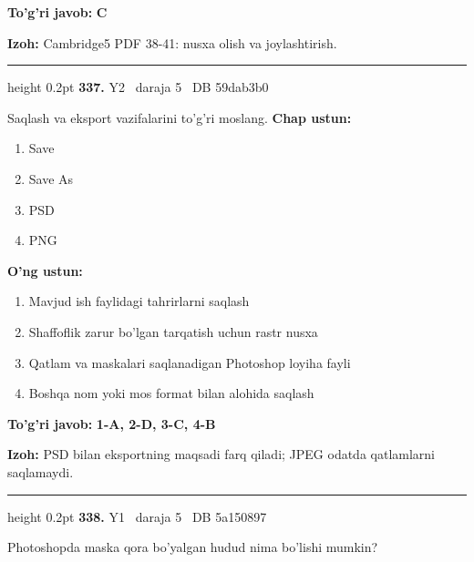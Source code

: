 \documentclass[10pt,a4paper,oneside]{article}
\begin{document}
\begin{tcolorbox}[enhanced,breakable,colback=teal!4,colframe=teal!45!black,boxrule=0.45pt,arc=1.2mm,left=2.8mm,right=2.8mm,top=2mm,bottom=2mm,before skip=2mm,after skip=2mm]
\textbf{\color{teal}To'g'ri javob:} \textbf{C}
\par\smallskip
\textbf{Izoh:} Cambridge5 PDF 38-41: nusxa olish va joylashtirish.
\end{tcolorbox}
\vspace{2mm}\hrule height 0.2pt \vspace{4mm}
\hypertarget{q337}{\textbf{\color{ink}337.}}  {\color{muted}\scriptsize Y2 \textbullet\ daraja 5 \textbullet\ DB 59dab3b0}
\par
Saqlash va eksport vazifalarini to'g'ri moslang.
\textbf{\footnotesize Chap ustun:}
\begin{enumerate}[label=\arabic*),leftmargin=9mm]
\item Save
\item Save As
\item PSD
\item PNG
\end{enumerate}
\textbf{\footnotesize O'ng ustun:}
\begin{enumerate}[label=\Alph*),leftmargin=9mm]
\item Mavjud ish faylidagi tahrirlarni saqlash
\item Shaffoflik zarur bo'lgan tarqatish uchun rastr nusxa
\item Qatlam va maskalari saqlanadigan Photoshop loyiha fayli
\item Boshqa nom yoki mos format bilan alohida saqlash
\end{enumerate}
\begin{tcolorbox}[enhanced,breakable,colback=teal!4,colframe=teal!45!black,boxrule=0.45pt,arc=1.2mm,left=2.8mm,right=2.8mm,top=2mm,bottom=2mm,before skip=2mm,after skip=2mm]
\textbf{\color{teal}To'g'ri javob:} \textbf{1-A, 2-D, 3-C, 4-B}
\par\smallskip
\textbf{Izoh:} PSD bilan eksportning maqsadi farq qiladi; JPEG odatda qatlamlarni saqlamaydi.
\end{tcolorbox}
\vspace{2mm}\hrule height 0.2pt \vspace{4mm}
\hypertarget{q338}{\textbf{\color{ink}338.}}  {\color{muted}\scriptsize Y1 \textbullet\ daraja 5 \textbullet\ DB 5a150897}
\par
Photoshopda maska qora bo'yalgan hudud nima bo'lishi mumkin?
\end{document}
